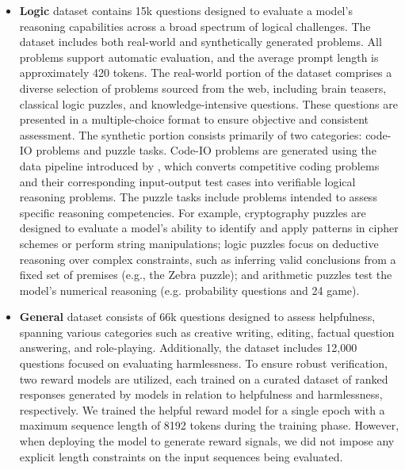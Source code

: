 \begin{itemize}
\item \textbf{Logic} dataset contains 15k questions designed to evaluate a model’s reasoning capabilities across a broad spectrum of logical challenges.  The dataset includes both real-world and synthetically generated problems. All problems support automatic evaluation, and the average prompt length is approximately 420 tokens.
The real-world portion of the dataset comprises a diverse selection of problems sourced from the web, including brain teasers, classical logic puzzles, and knowledge-intensive questions.  These questions are presented in a multiple-choice format to ensure objective and consistent assessment.
The synthetic portion consists primarily of two categories: code-IO problems and puzzle tasks. Code-IO problems are generated using the data pipeline introduced by \cite{li2025codei}, which converts competitive coding problems and their corresponding input-output test cases into verifiable logical reasoning problems. The puzzle tasks include problems intended to assess specific reasoning competencies. For example, cryptography puzzles are designed to evaluate a model's ability to identify and apply patterns in cipher schemes or perform string manipulations; logic puzzles focus on deductive reasoning over complex constraints, such as inferring valid conclusions from a fixed set of premises (e.g., the Zebra puzzle); and arithmetic puzzles test the model’s numerical reasoning (e.g. probability questions and 24 game).


\item \textbf{General} dataset consists of 66k questions designed to assess helpfulness, spanning various categories such as creative writing, editing, factual question answering, and role-playing. Additionally, the dataset includes 12,000 questions focused on evaluating harmlessness. To ensure robust verification, two reward models are utilized, each trained on a curated dataset of ranked responses generated by models in relation to helpfulness and harmlessness, respectively. We trained the helpful reward model for a single epoch with a maximum sequence length of 8192 tokens during the training phase. However, when deploying the model to generate reward signals, we did not impose any explicit length constraints on the input sequences being evaluated.
\end{itemize}


